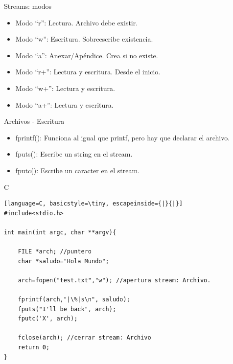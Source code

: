 \documentclass{beamer}
\begin{document}
\begin{frame}[fragile]{Streams: modos}
\begin{itemize}
	\item Modo ``r'': Lectura. Archivo debe existir.
	\item Modo ``w'': Escritura. Sobreescribe existencia.
	\item Modo ``a'': Anexar/Apéndice. Crea si no existe.
	\item Modo ``r+'': Lectura y escritura. Desde el inicio. 
	\item Modo ``w+'': Lectura y escritura. 
	\item Modo ``a+'': Lectura y escritura.
\end{itemize}
\end{frame}

\begin{frame}[fragile]{Archivos - Escritura}
\begin{itemize}
	\item fprintf(): Funciona al igual que printf, pero hay que declarar el archivo.
	\item fputs(): Escribe un string en el stream.
	\item fputc(): Escribe un caracter en el stream.
	\end{itemize}
\begin{exampleblock}{C}
\begin{lstlisting}[language=C, basicstyle=\tiny, escapeinside={|}{|}]
#include<stdio.h>

int main(int argc, char **argv){

	FILE *arch; //puntero
	char *saludo="Hola Mundo";

	arch=fopen("test.txt","w"); //apertura stream: Archivo.

	fprintf(arch,"|\%|s\n", saludo);
	fputs("I'll be back", arch);
	fputc('X', arch);

	fclose(arch); //cerrar stream: Archivo
	return 0;
}
\end{lstlisting}
\end{exampleblock}
\end{frame}
\end{document}
